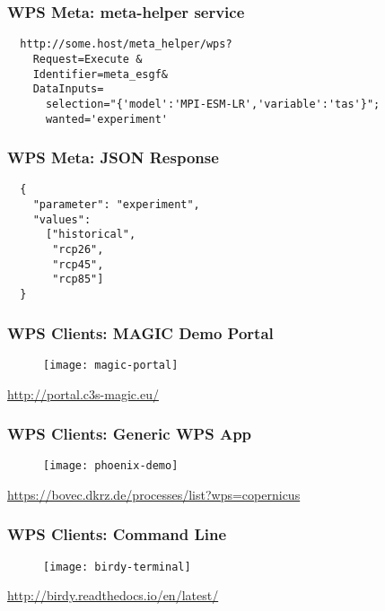 \documentclass{beamer}
\begin{document}
\begin{frame}[fragile]
\frametitle<presentation>{WPS Meta: meta-helper service}

  \lstset{language=XML}
  \begin{lstlisting}
  http://some.host/meta_helper/wps?
    Request=Execute &
    Identifier=meta_esgf&
    DataInputs=
      selection="{'model':'MPI-ESM-LR','variable':'tas'}";
      wanted='experiment'
  \end{lstlisting}

\end{frame}

\begin{frame}[fragile]
\frametitle<presentation>{WPS Meta: JSON Response}
  \lstset{language=JSON}
  \begin{lstlisting}
  {
    "parameter": "experiment",
    "values":
      ["historical",
       "rcp26",
       "rcp45",
       "rcp85"]
  }
  \end{lstlisting}

\end{frame}

\begin{frame}
\frametitle<presentation>{WPS Clients: MAGIC Demo Portal}

  \begin{figure}[ht]
    \centering
    \texttt{[image: magic-portal]}
  \end{figure}

  \centering
  \footnotesize{\url{http://portal.c3s-magic.eu/}}

\end{frame}

\begin{frame}
\frametitle<presentation>{WPS Clients: Generic WPS App}

  \begin{figure}[ht]
    \centering
    \texttt{[image: phoenix-demo]}
  \end{figure}

  \centering
  \footnotesize{\url{https://bovec.dkrz.de/processes/list?wps=copernicus}}

\end{frame}

\begin{frame}
\frametitle<presentation>{WPS Clients: Command Line}

  \begin{figure}[ht]
    \centering
    \texttt{[image: birdy-terminal]}
  \end{figure}

  \centering
  \footnotesize{\url{http://birdy.readthedocs.io/en/latest/}}

\end{frame}
\end{document}
